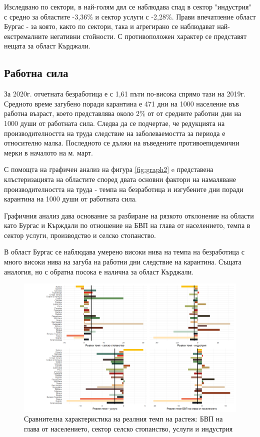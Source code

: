 \documentclass[a4paper,12pt]{article}
\begin{document}
Изследвано по сектори, в най-голям дял се наблюдава спад в сектор "индустрия" с средно за областите -3,36\% и сектор услуги с -2,28\%. Прави впечатление област Бургас - за която, както по сектори, така и агрегирано се наблюдават най-екстремалните негативни стойности. С противоположен характер се представят нещата за област Кърджали.  

\subsection{Работна сила}
За 2020г. отчетната безработица е с 1,61 пъти по-висока спрямо тази на 2019г. Средното време загубено поради карантина е 471 дни на 1000 население във работна възраст, което представлява около 2\% от от средните работни дни на 1000 души от работната сила. Следва да се подчертае, че редукцията на производителността на труда следствие на заболеваемостта за периода е относително малка. Последното се дължи на въведените противоепидемични мерки в началото на м. март. 

С помощта на графичен анализ на фигура \ref{fig:graph2} e представена клъстеризацията на областите според двата основни фактори на намаляване производителността на труда - темпа на безработица и изгубените дни поради карантина на 1000 души от работната сила.


Графичния анализ дава основание за разбиране на рязкото отклонение на области като Бургас и Кърждали по отношение на БВП на глава от населението, темпа в сектор услуги, производство и селско стопанство.

В област Бургас се наблюдава умерено високи нива на темпа на безработица с много високи нива на загуба на работни дни следствие на карантина. Същата аналогия, но с обратна посока е налична за област Кърджали. 


\newpage
\begin{figure}[H]
	\centering
	\includegraphics[width=1.45\textwidth, angle =90 ]{../graphics/gdpc_tem}
	\caption{Сравнителна характеристика на реалния темп на растеж: БВП на глава от населението, сектор селско стопанство, услуги и индустрия}
	\label{fig:gdpctem}
\end{figure}
\newpage
\end{document}
